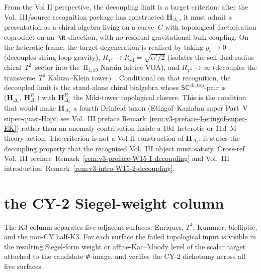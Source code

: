 \begin{remark}
\label{rem:wac-W15-3-decoupling}
From the Vol II perspective, the decoupling limit is a target criterion:
after the Vol.~III/source recognition package has constructed
\(\mathbf{H}_{\Delta_5}\), it must admit a presentation as a chiral algebra
living on a curve~$C$ with topological~factorisation coproduct on
an~$\R$-direction, with no residual gravitational bulk coupling. On the
heterotic frame, the target degeneration is realised by taking
$g_s \to 0$ (decouples string-loop gravity),
$R_{T^2}\to R_{\mathrm{sd}} = \sqrt{\alpha'/2}$ (isolates the
self-dual-radius chiral~$T^2$~sector into the~$\mathrm{II}_{3,19}$
Narain lattice VOA), and $R_{T^4}\to\infty$ (decouples the
transverse~$T^4$ Kaluza--Klein tower)~\cite{HarveyMoore1996,
NahmWendland2001,TaorminaWendland2011}. Conditional on that recognition,
the decoupled limit is the stand-alone chiral bialgebra whose
$\mathsf{SC}^{\mathrm{ch,top}}$-pair is
$\bigl(\mathbf{H}_{\Delta_5},\,\mathbf{H}_{\Delta_5}^{R}\bigr)$
with $\mathbf{H}_{\Delta_5}^{R}$ the Miki-tower topological
closure. This is the condition that would make \(\mathbf H_{\Delta_5}\) a
fourth Drinfeld taxon (Etingof--Kazhdan super Part~V super-quasi-Hopf; see
Vol.~III preface Remark~\ref{rem:v3-preface-4-etingof-super-EK}) rather
than an anomaly contribution inside a 10d~heterotic or 11d~M-theory action.
The criterion is not a Vol II construction of \(\mathbf H_{\Delta_5}\); it
states the decoupling property that the recognised Vol.~III object must
satisfy. Cross-ref
Vol.~III preface~Remark~\ref{rem:v3-preface-W15-1-decoupling}
and Vol.~III introduction~Remark~\ref{rem:v3-intro-W15-2-decoupling}.
\end{remark}

\section{the CY-2 Siegel-weight column}
\label{sec:wac-supplement-iii}

The K3 column separates five adjacent surfaces: Enriques, $T^4$,
Kummer, bielliptic, and the non-CY half-K3. For each surface the
failed topological input is visible in the resulting
Siegel-form weight or affine-Kac--Moody level of the scalar target
attached to the candidate $\Phi$-image, and verifies the CY-$2$
dichotomy across all five surfaces.

